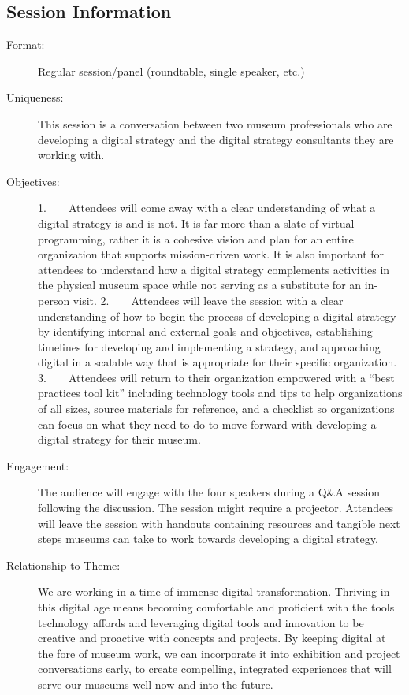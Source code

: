 \documentclass{report}
\begin{document}
              \subsection*{Session Information}
                \begin{description}
                  \item [Format:] Regular session/panel (roundtable, single speaker, etc.)
							    
							    \item [Uniqueness:]This session is a conversation between two museum professionals who are developing a digital strategy and the digital strategy consultants they are working with.
							    \item [Objectives:]1.    Attendees will come away with a clear understanding of what a digital strategy is and is not. It is far more than a slate of virtual programming, rather it is a cohesive vision and plan for an entire organization that supports mission-driven work. It is also important for attendees to understand how a digital strategy complements activities in the physical museum space while not serving as a substitute for an in-person visit.
2.    Attendees will leave the session with a clear understanding of how to begin the process of developing a digital strategy by identifying internal and external goals and objectives, establishing timelines for developing and implementing a strategy, and approaching digital in a scalable way that is appropriate for their specific organization.
3.    Attendees will return to their organization empowered with a “best practices tool kit” including technology tools and tips to help organizations of all sizes, source materials for reference, and a checklist so organizations can focus on what they need to do to move forward with developing a digital strategy for their museum.
							    \item [Engagement:]The audience will engage with the four speakers during a Q\&A session following the discussion. The session might require a projector. Attendees will leave the session with handouts containing resources and tangible next steps museums can take to work towards developing a digital strategy.
							    \item [Relationship to Theme:]We are working in a time of immense digital transformation. Thriving in this digital age means becoming comfortable and proficient with the tools technology affords and leveraging digital tools and innovation to be creative and proactive with concepts and projects. By keeping digital at the fore of museum work, we can incorporate it into exhibition and project conversations early, to create compelling, integrated experiences that will serve our museums well now and into the future.
							    
                \end{description}
\end{document}

